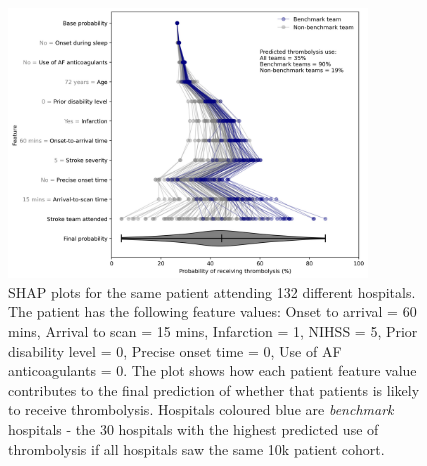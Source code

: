 \begin{figure}
\centering
\includegraphics[width=0.85\textwidth]{./images/21_shap_waterfall_with_violin_contentious}
\caption{SHAP plots for the same patient attending 132 different hospitals. The patient has the following feature values: Onset to arrival = 60 mins, Arrival to scan = 15 mins, Infarction = 1, NIHSS = 5, Prior disability level = 0, Precise onset time = 0, Use of AF anticoagulants = 0. The plot shows how each patient feature value contributes to the final prediction of whether that patients is likely to receive thrombolysis. Hospitals coloured blue are \emph{benchmark} hospitals - the 30 hospitals with the highest predicted use of thrombolysis if all hospitals saw the same 10k patient cohort.}
\label{fig:results_artifical_shap_waterfall_with_violin}
\end{figure}








